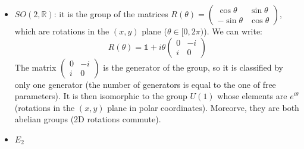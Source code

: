 \documentclass[../../main/main.tex]{subfiles}
\begin{document}
\begin{example}
\begin{itemize}
\item $SO(2, \mathbb{R})$: it is the group of the matrices $R(\theta)=\begin{pmatrix}
					\cos{\theta}	&	\sin{\theta}	\\
					-\sin{\theta}	&	\cos{\theta}
				\end{pmatrix}$, which are rotations in the $(x, y)$ plane ($\theta \in [0, 2\pi )$). \newline
We can write:
\begin{equation*}
R(\theta)=\mathbb{1}+ i \theta \begin{pmatrix}
					0	&	-i	\\
					i	&	0
				\end{pmatrix}
\end{equation*}
The matrix $\begin{pmatrix}
					0	&	-i	\\
					i	&	0
				\end{pmatrix}$ is the generator of the group, so it is classified by only one generator (the number of generators is equal to the one of free parameters). \newline
It is then isomorphic to the group $U(1)$ whose elements are $e^{i \theta}$ (rotations in the $(x, y)$ plane in polar coordinates). \newline
Moreorve, they are both abelian groups (2D rotations commute).
\item $E_2$
\end{itemize}
\end{example}
\end{document}
